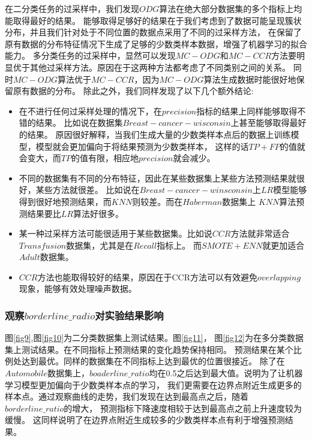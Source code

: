 \documentclass{article}
\begin{document}
在二分类任务的过采样中，我们发现$ODG$算法在绝大部分数据集的多个指标上均能取得最好的结果。
能够取得足够好的结果在于我们考虑到了数据可能呈现簇状分布，并且我们针对处于不同位置的数据点采用了不同的过采样方法，
在保留了原有数据的分布特征情况下生成了足够的少数类样本数据，增强了机器学习的拟合能力。
多分类任务的过采样中，显然可以发现$MC-ODG$和$MC-CCR$方法要明显优于其他过采样方法。原因在于这两种方法都考虑了不同类别之间的关系。
同时$MC-ODG$算法优于$MC-CCR$，因为$MC-ODG$算法生成数据时能很好地保留原有数据的分布。
除此之外，我们同样发现了以下几个额外结论:
\begin{itemize}
  \item 在不进行任何过采样处理的情况下，在$precision$指标的结果上同样能够取得不错的结果。
  比如说在数据集$Breast-cancer-wisconsin$上甚至能够取得最好的结果。
  原因很好解释，当我们生成大量的少数类样本点后的数据上训练模型，模型就会更加偏向于将结果预测为少数类样本，
  这样的话$TP+FP$的值就会变大，而$TP$的值有限，相应地$precision$就会减少。
  \item 不同的数据集有不同的分布特征，因此在某些数据集上某些方法预测结果就很好，某些方法就很差。
  比如说在$Breast-cancer-winsconsin$上$LR$模型能够得到很好地预测结果，而$KNN$则较差。而在$Haberman$数据集上
  $KNN$算法预测结果要比$LR$算法好很多。
  \item 某一种过采样方法可能很适用于某些数据集。比如说$CCR$方法就非常适合$Transfusion$数据集，尤其是在$Recall$指标上。
  而$SMOTE+ENN$就更加适合$Adult$数据集。
  \item $CCR$方法也能取得较好的结果，原因在于CCR方法可以有效避免$overlapping$现象，能够有效处理噪声数据。
\end{itemize}

\subsubsection{观察$borderline\_radio$对实验结果影响}
图\ref{fig9},图\ref{fig10}为二分类数据集上测试结果。图\ref{fig11}，
图\ref{fig12}为在多分类数据集上测试结果。在不同指标上预测结果的变化趋势保持相同。
预测结果在某个比例处达到最优。同样的数据集在不同指标上达到最优的位置很接近。
除了在$Automobile$数据集上，$boaderline\_ratio$均在0.5之后达到最大值。说明为了让机器学习模型更加偏向于少数类样本点的学习，
我们更需要在边界点附近生成更多的样本点。通过观察曲线的走势，我们发现在达到最高点之后，随着$borderline\_ratio$的增大，
预测指标下降速度相较于达到最高点之前上升速度较为缓慢。
这同样说明了在边界点附近生成较多的少数类样本点有利于增强预测结果。
\end{document}

